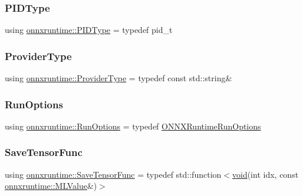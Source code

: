 \subsubsection{\texorpdfstring{P\+I\+D\+Type}{PIDType}}
{\footnotesize\ttfamily using \mbox{\hyperlink{namespaceonnxruntime_ab899e71c070d3fe82ae09bb53075b258}{onnxruntime\+::\+P\+I\+D\+Type}} = typedef pid\+\_\+t}

\mbox{\label{namespaceonnxruntime_a863e2227cbf32aab76aad35fdadff4bb}} 
\subsubsection{\texorpdfstring{Provider\+Type}{ProviderType}}
{\footnotesize\ttfamily using \mbox{\hyperlink{namespaceonnxruntime_a863e2227cbf32aab76aad35fdadff4bb}{onnxruntime\+::\+Provider\+Type}} = typedef const std\+::string\&}

\mbox{\label{namespaceonnxruntime_a28ccb3d97f6827bf04d2ce259ff968f1}} 
\subsubsection{\texorpdfstring{Run\+Options}{RunOptions}}
{\footnotesize\ttfamily using \mbox{\hyperlink{namespaceonnxruntime_a28ccb3d97f6827bf04d2ce259ff968f1}{onnxruntime\+::\+Run\+Options}} = typedef \mbox{\hyperlink{structONNXRuntimeRunOptions}{O\+N\+N\+X\+Runtime\+Run\+Options}}}

\mbox{\label{namespaceonnxruntime_a5fae67d87ce801a6093492d9af44a5bc}} 
\subsubsection{\texorpdfstring{Save\+Tensor\+Func}{SaveTensorFunc}}
{\footnotesize\ttfamily using \mbox{\hyperlink{namespaceonnxruntime_a5fae67d87ce801a6093492d9af44a5bc}{onnxruntime\+::\+Save\+Tensor\+Func}} = typedef std\+::function$<$\mbox{\hyperlink{mlasi_8h_a88f941d423cb2a819b70a1358982b1a6}{void}}(int idx, const \mbox{\hyperlink{classonnxruntime_1_1MLValue}{onnxruntime\+::\+M\+L\+Value}}\&)$>$}

